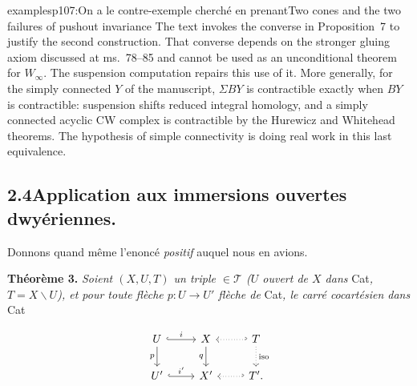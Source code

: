 \begin{dcomment}{examples}{p107:On a le contre-exemple cherché en prenant}{Two cones and the two failures of pushout invariance}
The text invokes the converse in Proposition~7 to justify the second construction. That converse depends on the stronger gluing axiom discussed at ms.~78--85 and cannot be used as an unconditional theorem for $W_\infty$. The suspension computation repairs this use of it. More generally, for the simply connected $Y$ of the manuscript, $\Sigma BY$ is contractible exactly when $BY$ is contractible: suspension shifts reduced integral homology, and a simply connected acyclic CW complex is contractible by the Hurewicz and Whitehead theorems. The hypothesis of simple connectivity is doing real work in this last equivalence.
\end{dcomment}


\subsection*{2.4\quad Application aux immersions ouvertes dwyériennes.}

Donnons quand même l'enoncé \textit{positif} auquel nous en avions. %

\textbf{Théorème 3.} \textit{Soient $(X,U,T)$ un triple $\in\mathcal{T}$ ($U$ ouvert de $X$ dans} Cat\textit{, $T=X\backslash U$), et pour toute flèche $p:U\longrightarrow U'$ flèche de} Cat\textit{, le carré cocartésien dans} Cat

\[
\begin{tikzcd}
U \arrow[r, hook, "i"] \arrow[d, "p"'] & X \arrow[d, "q"'] & T \arrow[l, dotted, hook'] \arrow[d, dotted, "\text{iso}"] \\
U' \arrow[r, hook, "i'"] & X' & T'. \arrow[l, dotted, hook']
\end{tikzcd}
\]



